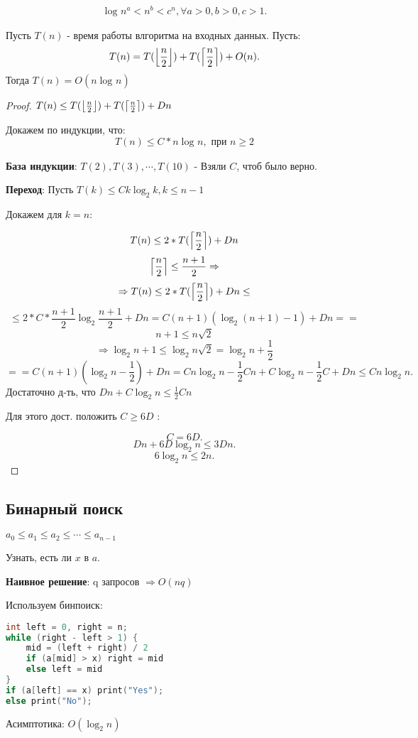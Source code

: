 \begin{statement}
\[
\log_{}{n}^{a} < n^{b} < c^{n}, \forall a > 0, b > 0, c > 1
.\] 
\end{statement}
\begin{statement}
Пусть $T(n)$ - время работы влгоритма на входных данных. Пусть:
\[
T(n) = T(\left\lfloor \frac{n}{2} \right\rfloor) + T(\left\lceil \frac{n}{2} \right\rceil) + O(n)
.\] 
Тогда $T(n) = O(n\log_{}{n})$
\end{statement}
\begin{proof}
$T(n) \leq T(\left\lfloor \frac{n}{2} \right\rfloor) + T(\left\lceil \frac{n}{2} \right\rceil) + Dn$ 

Докажем по индукции, что:
\[
    T(n) \leq C * n\log_{}{n}, \text{ при } n \geq 2
\]

\textbf{База индукции}: $T(2), T(3), \cdots, T(10)$ - Взяли $C$, чтоб было верно.

\textbf{Переход}: Пусть $T(k) \leq Ck\log_{2}{k}, k \leq n - 1$ 

Докажем для $k = n$:

\[
T(n) \leq 2 * T(\left\lceil \frac{n}{2} \right\rceil) + Dn
\] 
\[
\left\lceil \frac{n}{2} \right\rceil \leq \frac{n + 1}{2} \Rightarrow
\] 
\[
\Rightarrow T(n) \leq 2 * T(\left\lceil \frac{n}{2} \right\rceil) + Dn \leq
\] 
\[
\leq 2 * C * \frac{n + 1}{2} \log_{2}{\frac{n + 1}{2}} + Dn = C(n + 1)(\log_{2}{(n + 1)} - 1) + Dn ==
\] 
\[
n + 1 \leq n\sqrt{2}
\] 
\[
\Rightarrow \log_{2}{n + 1} \leq \log_{2}{n\sqrt{2}} = \log_{2}{n} + \frac{1}{2}
\] 
\[
== C(n + 1)(\log_{2}{n} - \frac{1}{2}) + Dn = Cn\log_{2}{n} - \frac{1}{2}Cn + C\log_{2}{n} - \frac{1}{2}C + Dn \leq Cn\log_{2}{n}
.\] 
Достаточно д-ть, что $Dn + C\log_{2}{n} \leq \frac{1}{2}Cn$

Для этого дост. положить $C \geq 6D$ :

 \[
 C = 6D
 .\] 
 \[
 Dn + 6D\log_{2}{n} \leq 3Dn
 .\] 
 \[
 6\log_{2}{n} \leq 2n
 .\] 
\end{proof}

\subsection{Бинарный поиск}
\begin{task}
$a_0 \leq a_1 \leq a_2 \leq \cdots \leq a_{n - 1}$
 
Узнать, есть ли $x$ в $a$.

\textbf{Наивное решение}: q запросов $\Rightarrow O(nq)$
\end{task}

\begin{solution}
Используем бинпоиск:
\lstset{style=mystyle}
\begin{lstlisting}[language=C++, caption=Binary Search]
int left = 0, right = n;
while (right - left > 1) {
    mid = (left + right) / 2 
    if (a[mid] > x) right = mid
    else left = mid
}
if (a[left] == x) print("Yes");
else print("No");
\end{lstlisting}
Асимптотика: $O(\log_{2}{n})$
\end{solution}

